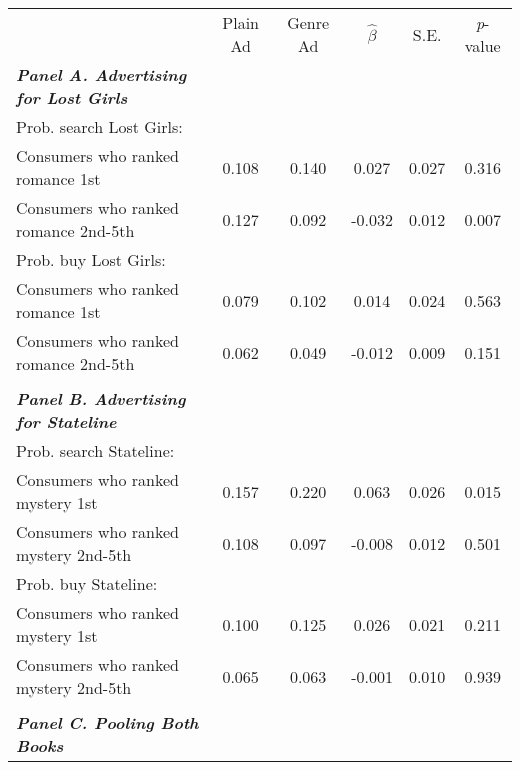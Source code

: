 \begin{center}
\begin{tabular}{lccccc}
\hline \noalign{\smallskip} & Plain Ad & Genre Ad & $\hat{\beta}$ & S.E. & \emph{p}-value\\
\noalign{\smallskip}\hline \noalign{\smallskip}\textbf{\emph{Panel A. Advertising for Lost Girls}} &  &  &  &  & \\
\hspace{5pt} Prob. search Lost Girls: &  &  &  &  & \\
\hspace{5pt} Consumers who ranked romance 1st & 0.108 & 0.140 & 0.027 & 0.027 & 0.316\\
\hspace{5pt} Consumers who ranked romance 2nd-5th & 0.127 & 0.092 & -0.032 & 0.012 & 0.007\\
\hspace{5pt} Prob. buy Lost Girls: &  &  &  &  & \\
\hspace{5pt} Consumers who ranked romance 1st & 0.079 & 0.102 & 0.014 & 0.024 & 0.563\\
\hspace{5pt} Consumers who ranked romance 2nd-5th & 0.062 & 0.049 & -0.012 & 0.009 & 0.151\\
  &  &  &  &  & \\
\textbf{\emph{Panel B. Advertising for Stateline}} &  &  &  &  & \\
\hspace{5pt} Prob. search Stateline: &  &  &  &  & \\
\hspace{5pt} Consumers who ranked mystery 1st & 0.157 & 0.220 & 0.063 & 0.026 & 0.015\\
\hspace{5pt} Consumers who ranked mystery 2nd-5th & 0.108 & 0.097 & -0.008 & 0.012 & 0.501\\
\hspace{5pt} Prob. buy Stateline: &  &  &  &  & \\
\hspace{5pt} Consumers who ranked mystery 1st & 0.100 & 0.125 & 0.026 & 0.021 & 0.211\\
\hspace{5pt} Consumers who ranked mystery 2nd-5th & 0.065 & 0.063 & -0.001 & 0.010 & 0.939\\
  &  &  &  &  & \\
\textbf{\emph{Panel C. Pooling Both Books}} &  &  &  &  & \\

\end{tabular}
\end{center}
